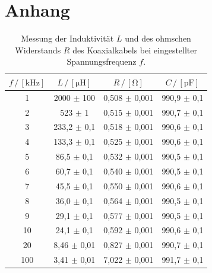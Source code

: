 \newpage
\section{Anhang}
\label{sec:Anhang}

\begin{table}[H]

    \centering
    \caption{Messung der Induktivität $L$ und des ohmschen Widerstands $R$ des Koaxialkabels bei eingestellter Spannungsfrequenz $f$.}
    \begin{tabular}{cccc}
    \toprule
    $f \,/\, [\unit{\kilo\hertz}]$& $L \,/\, [\unit{\micro\henry}]$ & $R \,/\, [\unit{\ohm}]$ & $C \,/\, [\unit{\pico\farad}]$  \\
    \midrule
    1   & 2000  $\pm$  100   &  0,508 $\pm$  0,001 &  990,9 $\pm$  0,1 \\
    2   & 523   $\pm$  1     &  0,515 $\pm$  0,001 &  990,7 $\pm$  0,1 \\
    3   & 233,2 $\pm$  0,1   &  0,518 $\pm$  0,001 &  990,6 $\pm$  0,1 \\
    4   & 133,3 $\pm$  0,1   &  0,525 $\pm$  0,001 &  990,6 $\pm$  0,1 \\
    5   & 86,5  $\pm$  0,1   &  0,532 $\pm$  0,001 &  990,5 $\pm$  0,1 \\
    6   & 60,7  $\pm$  0,1   &  0,540 $\pm$  0,001 &  990,5 $\pm$  0,1 \\
    7   & 45,5  $\pm$  0,1   &  0,550 $\pm$  0,001 &  990,6 $\pm$  0,1 \\
    8   & 36,0  $\pm$  0,1   &  0,564 $\pm$  0,001 &  990,5 $\pm$  0,1 \\
    9   & 29,1  $\pm$  0,1   &  0,577 $\pm$  0,001 &  990,5 $\pm$  0,1 \\
    10  & 24,1  $\pm$  0,1   &  0,592 $\pm$  0,001 &  990,6 $\pm$  0,1 \\
    20  & 8,46  $\pm$  0,01  &  0,827 $\pm$  0,001 &  990,7 $\pm$  0,1 \\
    100 & 3,41  $\pm$  0,01  &  7,022 $\pm$  0,001 &  991,7 $\pm$  0,1 \\
    \bottomrule
    \end{tabular}
    \label{tab:messind}
\end{table}



